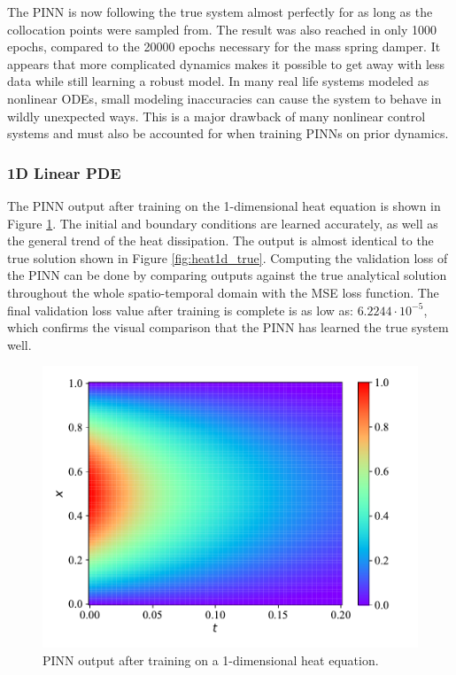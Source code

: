 The PINN is now following the true system almost perfectly for as long as the collocation points were sampled from. The result was also reached in only 1000 epochs, compared to the 20000 epochs necessary for the mass spring damper. It appears that more complicated dynamics makes it possible to get away with less data while still learning a robust model. In many real life systems modeled as nonlinear ODEs, small modeling inaccuracies can cause the system to behave in wildly unexpected ways. This is a major drawback of many nonlinear control systems \cite{nonlinearsystems} and must also be accounted for when training PINNs on prior dynamics.

\subsubsection{1D Linear PDE}

The PINN output after training on the 1-dimensional heat equation is shown in Figure \ref{fig:heat1d}. The initial and boundary conditions are learned accurately, as well as the general trend of the heat dissipation. The output is almost identical to the true solution shown in Figure \ref{fig:heat1d_true}. Computing the validation loss of the PINN can be done by comparing outputs against the true analytical solution throughout the whole spatio-temporal domain with the MSE loss function. The final validation loss value after training is complete is as low as: $6.2244 \cdot 10^{-5}$, which confirms the visual comparison that the PINN has learned the true system well.

\begin{figure}[H]
    \centering
    \includegraphics[width=1.0\linewidth]{Figures/InitialExperiments/heat1d.pdf}
    \caption{PINN output after training on a 1-dimensional heat equation.}
    \label{fig:heat1d}
\end{figure}

